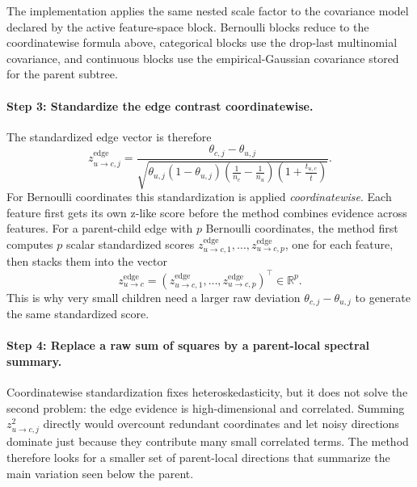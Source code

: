 The implementation applies the same nested scale factor to the covariance model
declared by the active feature-space block. Bernoulli blocks reduce to the
coordinatewise formula above, categorical blocks use the drop-last multinomial
covariance, and continuous blocks use the empirical-Gaussian covariance stored
for the parent subtree.

\paragraph{Step 3: Standardize the edge contrast coordinatewise.}
The standardized edge vector is therefore
\begin{equation}
z_{u \to c,j}^{\mathrm{edge}}
=
\frac{\theta_{c,j} - \theta_{u,j}}
{\sqrt{\theta_{u,j}(1-\theta_{u,j})
\left(\frac{1}{n_c} - \frac{1}{n_u}\right)
\left(1+\frac{t_{u,c}}{\bar t}\right)}}.
\end{equation}
For Bernoulli coordinates this standardization is applied
\emph{coordinatewise}. Each feature first gets its own z-like score before the
method combines evidence across features. For a parent-child edge with $p$
Bernoulli coordinates, the method first computes $p$ scalar standardized scores
$z_{u \to c,1}^{\mathrm{edge}},\dots,z_{u \to c,p}^{\mathrm{edge}}$, one for
each feature, then stacks them into the vector
\begin{equation}
z_{u \to c}^{\mathrm{edge}}
=
\left(
z_{u \to c,1}^{\mathrm{edge}},
\dots,
z_{u \to c,p}^{\mathrm{edge}}
\right)^\top
\in \mathbb{R}^p.
\end{equation}
This is why very small children need a larger raw deviation
$\theta_{c,j} - \theta_{u,j}$ to generate the same standardized score.

\paragraph{Step 4: Replace a raw sum of squares by a parent-local spectral summary.}
Coordinatewise standardization fixes heteroskedasticity, but it does not solve
the second problem: the edge evidence is high-dimensional and correlated.
Summing $z_{u \to c,j}^2$ directly would overcount redundant coordinates and let
noisy directions dominate just because they contribute many small correlated
terms. The method therefore looks for a smaller set of parent-local directions
that summarize the main variation seen below the parent.

